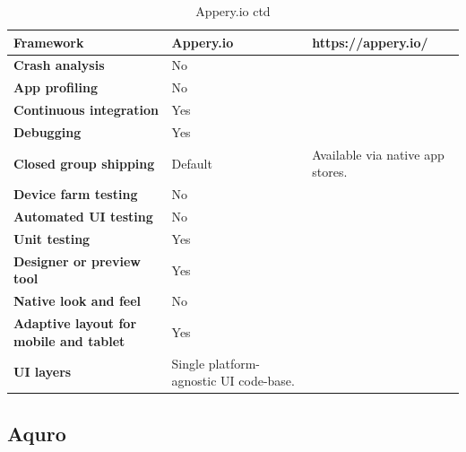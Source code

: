 \documentclass[english,master,public,dept460,male,cpdeclaration,oneside]{diploma}
\begin{document}
\begin{table}[!h]
	\centering
	\caption{Appery.io ctd}
	\begin{tabular}{p{} | p{} | p{}}
		\toprule		
		\textbf{Framework} & \textbf{Appery.io} & https://appery.io/ \\
		\midrule
		\textbf{Crash analysis} & No &  \\			
		\midrule
		\textbf{App profiling} & No & \\			
		\midrule
		\textbf{Continuous integration} & Yes & \\			
		\midrule
		\textbf{Debugging} & Yes & \\			
		\midrule
		\textbf{Closed group shipping} & Default & Available via native app stores. \\			
		\midrule
		\textbf{Device farm testing} & No & \\	
		\midrule
		\textbf{Automated UI testing} & No & \\			
		\midrule
		\textbf{Unit testing} & Yes & \\			
		\midrule
		\textbf{Designer or preview tool} & Yes & \\			
		\midrule
		\textbf{Native look and feel} & No & \\			
		\midrule
		\textbf{Adaptive layout for mobile and tablet} & Yes & \\			
		\midrule		
		\textbf{UI layers} & Single platform-agnostic UI code-base. &  \\			
		\midrule
	\end{tabular}
\end{table}

\clearpage
\subsection{Aquro}
\end{document}
